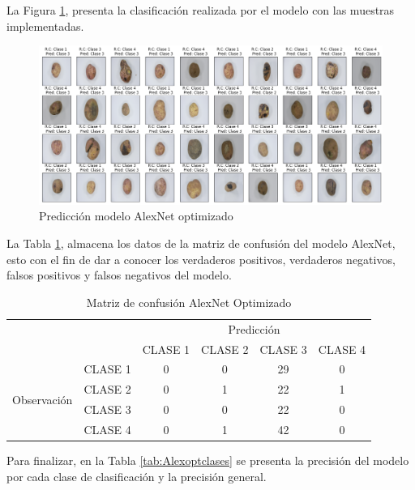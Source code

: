 	\newpage
	La Figura \ref{fig:pre_alex_opt}, presenta la clasificación realizada por el modelo con las muestras implementadas.
		\begin{figure}[ht]
			\centering
			\includegraphics[scale=0.4]{Figs/502.png}
			\caption{Predicción modelo AlexNet optimizado}
			\label{fig:pre_alex_opt}
		\end{figure}
		
	
	La Tabla \ref{tab:MC_ALEX_OPT}, almacena los datos de la matriz de confusión del modelo AlexNet, esto con el fin de dar a conocer los verdaderos positivos, verdaderos negativos, falsos positivos y falsos negativos del modelo.
	

		\begin{table}[htbp]
			\centering
			\begin{tabular}{|c|l|c|c|c|c|}
				\hline
				\multicolumn{2}{|c|}{\multirow{2}[4]{*}{}} & \multicolumn{4}{c|}{Predicción} \bigstrut\\
				\cline{3-6}    \multicolumn{2}{|c|}{} & CLASE 1 & CLASE 2 & CLASE 3 & CLASE 4 \bigstrut\\
				\hline
				\multirow{4}[8]{*}{\begin{sideways}Observación\end{sideways}} & CLASE 1 & 0     & 0     & 29    & 0 \bigstrut\\
				\cline{2-6}          & CLASE 2 & 0     & 1     & 22    & 1 \bigstrut\\
				\cline{2-6}          & CLASE 3 & 0     & 0     & 22    & 0 \bigstrut\\
				\cline{2-6}          & CLASE 4 & 0     & 1     & 42    & 0 \bigstrut\\
				\hline
			\end{tabular}%
			\caption{Matriz de confusión AlexNet Optimizado }
			\label{tab:MC_ALEX_OPT}%
		\end{table}%
	
	Para finalizar, en la Tabla \ref{tab:Alexoptclases} se presenta la precisión del modelo por cada clase de clasificación y la precisión general.
	
